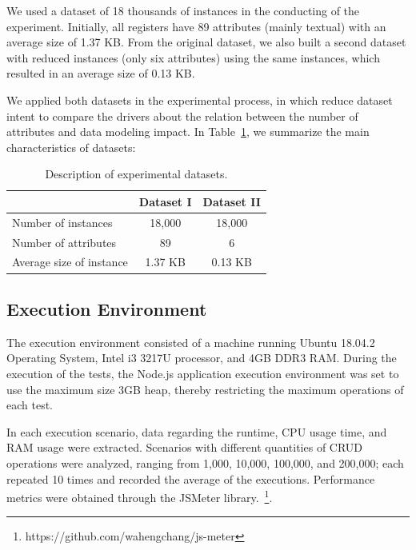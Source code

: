 \documentclass{svproc}
\begin{document}
We used a dataset of 18 thousands of instances in the conducting of the experiment. Initially, all registers have 89 attributes (mainly textual) with an average size of 1.37 KB.
From the original dataset, we also built a second dataset with reduced instances (only six attributes) using the same instances, which resulted in an average size of 0.13 KB.

We applied both datasets in the experimental process, in which reduce dataset intent to compare the drivers about the relation between the number of attributes and data modeling impact.
In Table~\ref{tab:conjunto-dados}, we summarize the main characteristics of datasets:

\begin{table}[ht]
\centering
\caption{Description of experimental datasets.}
\label{tab:conjunto-dados}
\begin{tabular}{c|c|c|}
\cline{2-3}
                         & \textbf{Dataset I} & \textbf{Dataset II} \\ \hline
\multicolumn{1}{|l|}{Number of instances} & 18,000 		 			& 18,000            \\ \hline
\multicolumn{1}{|l|}{Number of attributes}  & 89        		 			& 6                  \\ \hline
\multicolumn{1}{|l|}{Average size of instance}   & 1.37 KB        				& 0.13 KB                    \\ \hline
\end{tabular}
\end{table}

\subsection{Execution Environment}

The execution environment consisted of a machine running Ubuntu 18.04.2 Operating System, Intel i3 3217U processor, and 4GB DDR3 RAM.
During the execution of the tests, the Node.js application execution environment was set to use the maximum size 3GB heap, thereby restricting the maximum operations of each test.

In each execution scenario, data regarding the runtime, CPU usage time, and RAM usage were extracted.
Scenarios with different quantities of CRUD operations were analyzed, ranging from 1,000, 10,000, 100,000, and 200,000; each repeated 10 times and recorded the average of the executions. Performance metrics were obtained through the JSMeter library.~\footnote{https://github.com/wahengchang/js-meter}. 
\end{document}
